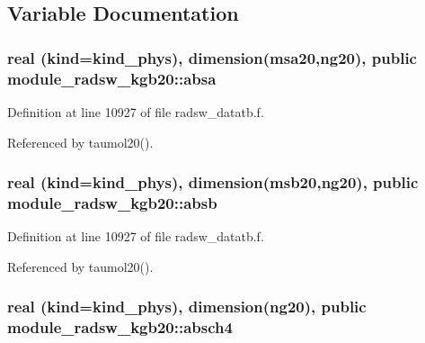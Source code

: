 \subsection{Variable Documentation}
\subsubsection[{\texorpdfstring{absa}{absa}}]{\setlength{\rightskip}{0pt plus 5cm}real (kind=kind\+\_\+phys), dimension({\bf msa20},ng20), public module\+\_\+radsw\+\_\+kgb20\+::absa}\hypertarget{namespacemodule__radsw__kgb20_a405eabf194b1216dd083c2344e80f5b4}{}\label{namespacemodule__radsw__kgb20_a405eabf194b1216dd083c2344e80f5b4}


Definition at line 10927 of file radsw\+\_\+datatb.\+f.



Referenced by taumol20().

\subsubsection[{\texorpdfstring{absb}{absb}}]{\setlength{\rightskip}{0pt plus 5cm}real (kind=kind\+\_\+phys), dimension({\bf msb20},ng20), public module\+\_\+radsw\+\_\+kgb20\+::absb}\hypertarget{namespacemodule__radsw__kgb20_af5b135f82f34831e86a12f726cbe47ad}{}\label{namespacemodule__radsw__kgb20_af5b135f82f34831e86a12f726cbe47ad}


Definition at line 10927 of file radsw\+\_\+datatb.\+f.



Referenced by taumol20().

\subsubsection[{\texorpdfstring{absch4}{absch4}}]{\setlength{\rightskip}{0pt plus 5cm}real (kind=kind\+\_\+phys), dimension(ng20), public module\+\_\+radsw\+\_\+kgb20\+::absch4}\hypertarget{namespacemodule__radsw__kgb20_a1757aee0ec8211f84e2c9334cc9b0f9d}{}\label{namespacemodule__radsw__kgb20_a1757aee0ec8211f84e2c9334cc9b0f9d}


